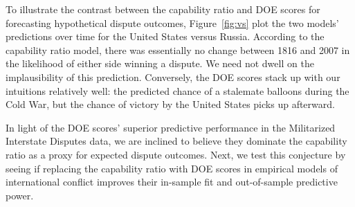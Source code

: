To illustrate the contrast between the capability ratio and DOE scores for forecasting hypothetical dispute outcomes, Figure~\ref{fig:vs} plot the two models' predictions over time for the United States versus Russia.
According to the capability ratio model, there was essentially no change between 1816 and 2007 in the likelihood of either side winning a dispute.
We need not dwell on the implausibility of this prediction.
Conversely, the DOE scores stack up with our intuitions relatively well: the predicted chance of a stalemate balloons during the Cold War, but the chance of victory by the United States picks up afterward.

In light of the DOE scores' superior predictive performance in the Militarized Interstate Disputes data, we are inclined to believe they dominate the capability ratio as a proxy for expected dispute outcomes.
Next, we test this conjecture by seeing if replacing the capability ratio with DOE scores in empirical models of international conflict improves their in-sample fit and out-of-sample predictive power.


